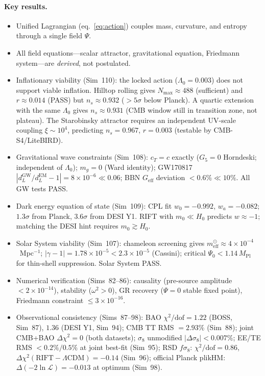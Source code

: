 \documentclass[12pt,a4paper]{article}
\begin{document}
\paragraph{Key results.}
\begin{itemize}
  \item Unified Lagrangian (eq.~\eqref{eq:action}) couples mass, curvature, and entropy through a single field $\Psi$.
  \item All field equations---scalar attractor, gravitational equation, Friedmann system---are \emph{derived}, not postulated.
  \item Inflationary viability (Sim~110): the locked action ($\Lambda_0=0.003$) does not support viable inflation.  Hilltop rolling gives $N_\mathrm{max}\approx488$ (sufficient) and $r\approx0.014$ (PASS) but $n_s\approx0.932$ ($>5\sigma$ below Planck).  A quartic extension with the same $\Lambda_0$ gives $n_s\approx0.931$ (CMB window still in transition zone, not plateau).  The Starobinsky attractor requires an independent UV-scale coupling $\xi\sim10^4$, predicting $n_s=0.967$, $r=0.003$ (testable by CMB-S4/LiteBIRD).
  \item Gravitational wave constraints (Sim~108): $c_T=c$ exactly ($G_5=0$ Horndeski; independent of $\Lambda_0$); $m_g=0$ (Ward identity); GW170817 $|d_L^\mathrm{GW}/d_L^\mathrm{EM}-1|=8\times10^{-6}\ll0.06$; BBN $G_\mathrm{eff}$ deviation $<0.6\%\ll10\%$.  All GW tests PASS.
  \item Dark energy equation of state (Sim~109): CPL fit $w_0=-0.992$, $w_a=-0.082$; $1.3\sigma$ from Planck, $3.6\sigma$ from DESI Y1.  RIFT with $m_0\ll H_0$ predicts $w\approx-1$; matching the DESI hint requires $m_0\gtrsim H_0$.
  \item Solar System viability (Sim~107): chameleon screening gives $m_\mathrm{eff}^\odot\approx4\times10^{-4}$~Mpc$^{-1}$; $|\gamma-1|=1.78\times10^{-5}<2.3\times10^{-5}$ (Cassini); critical $\Psi_0<1.14\,M_\mathrm{Pl}$ for thin-shell suppression.  Solar System PASS.
  \item Numerical verification (Sims~82--86): causality (pre-source amplitude $< 2\times 10^{-14}$), stability ($\omega^2 > 0$), GR recovery ($\Psi = 0$ stable fixed point), Friedmann constraint $\leq 3 \times 10^{-16}$.
  \item Observational consistency (Sims~87--98): BAO $\chi^2/\mathrm{dof} = 1.22$ (BOSS, Sim~87), $1.36$ (DESI Y1, Sim~94); CMB TT RMS $= 2.93\%$ (Sim~88); joint CMB+BAO $\Delta\chi^2 = 0$ (both datasets); $\sigma_8$ unmodified $|\Delta\sigma_8| < 0.007\%$; EE/TE RMS $< 0.2\%/0.5\%$ at joint best-fit (Sim~95); RSD $f\sigma_8$: $\chi^2/\mathrm{dof}=0.86$, $\Delta\chi^2(\mathrm{RIFT}-\Lambda\mathrm{CDM})=-0.14$ (Sim~96); official Planck plikHM: $\Delta(-2\ln\mathcal{L})=-0.013$ at optimum (Sim~98).

\end{itemize}
\end{document}
